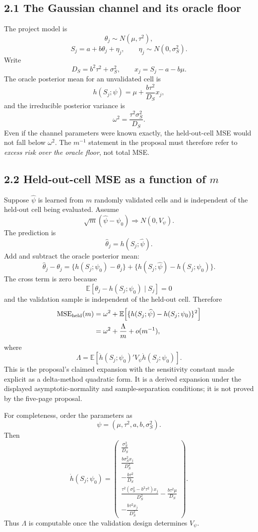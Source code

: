 \documentclass[11pt]{article}
\newcommand{\E}{\mathbb{E}}
\newcommand{\MSE}{\operatorname{MSE}}
\begin{document}
\subsection*{2.1 The Gaussian channel and its oracle floor}

The project model is
\[
    \theta_j\sim N(\mu,\tau^2),
\]
\[
    S_j=a+b\theta_j+\eta_j,
    \qquad
    \eta_j\sim N(0,\sigma_S^2).
\]
Write
\[
    D_S=b^2\tau^2+\sigma_S^2,
    \qquad
    x_j=S_j-a-b\mu.
\]
The oracle posterior mean for an unvalidated cell is
\[
    h(S_j;\psi)
    =
    \mu+\frac{b\tau^2}{D_S}x_j,
\]
and the irreducible posterior variance is
\[
    \omega^2
    =
    \frac{\tau^2\sigma_S^2}{D_S}.
\]
Even if the channel parameters were known exactly, the held-out-cell MSE would
not fall below \(\omega^2\). The \(m^{-1}\) statement in the proposal must
therefore refer to \emph{excess risk over the oracle floor}, not total MSE.

\subsection*{2.2 Held-out-cell MSE as a function of \(m\)}

Suppose \(\widehat\psi\) is learned from \(m\) randomly validated cells and is
independent of the held-out cell being evaluated. Assume
\[
    \sqrt m(\widehat\psi-\psi_0)
    \Rightarrow
    N(0,V_\psi).
\]
The prediction is
\[
    \widehat\theta_j=h(S_j;\widehat\psi).
\]
Add and subtract the oracle posterior mean:
\[
    \widehat\theta_j-\theta_j
    =
    \{h(S_j;\psi_0)-\theta_j\}
    +
    \{h(S_j;\widehat\psi)-h(S_j;\psi_0)\}.
\]
The cross term is zero because
\[
    \E[\theta_j-h(S_j;\psi_0)\mid S_j]=0
\]
and the validation sample is independent of the held-out cell. Therefore
\begin{align*}
    \MSE_{\rm held}(m)
    &=
    \omega^2
    +
    \E\!\left[
      \{h(S_j;\widehat\psi)-h(S_j;\psi_0)\}^2
    \right]\\
    &=
    \omega^2+\frac{\Lambda}{m}+o(m^{-1}),
\end{align*}
where
\[
    \Lambda
    =
    \E\!\left[
      \dot h(S_j;\psi_0)'V_\psi
      \dot h(S_j;\psi_0)
    \right].
\]
This is the proposal's claimed expansion with the sensitivity constant made
explicit as a delta-method quadratic form. It is a derived expansion under the
displayed asymptotic-normality and sample-separation conditions; it is not
proved by the five-page proposal.

For completeness, order the parameters as
\[
    \psi=(\mu,\tau^2,a,b,\sigma_S^2).
\]
Then
\[
\dot h(S_j;\psi_0)
=
\begin{pmatrix}
\displaystyle \frac{\sigma_S^2}{D_S}\\[0.8em]
\displaystyle \frac{b\sigma_S^2x_j}{D_S^2}\\[0.8em]
\displaystyle -\frac{b\tau^2}{D_S}\\[0.8em]
\displaystyle
\frac{\tau^2(\sigma_S^2-b^2\tau^2)x_j}{D_S^2}
-\frac{b\tau^2\mu}{D_S}\\[0.8em]
\displaystyle -\frac{b\tau^2x_j}{D_S^2}
\end{pmatrix}.
\]
Thus \(\Lambda\) is computable once the validation design determines
\(V_\psi\).
\end{document}
